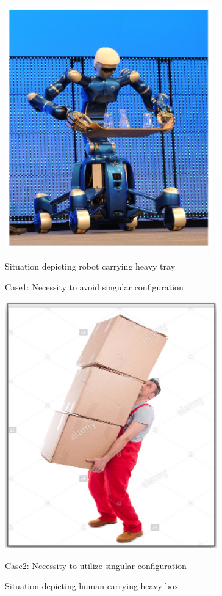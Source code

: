\begin{figure}[h!]
	\centering
	\begin{minipage}{0.45\textwidth}
		\centering
		\includegraphics[width=0.8\textwidth]{images/mot1} %
		\caption{Situation depicting robot carrying heavy tray \cite{robottray}}
		{Case1: Necessity to avoid singular configuration}
	\end{minipage}\hfill
	\begin{minipage}{0.45\textwidth}
		\centering
		\includegraphics[width=0.82\textwidth]{images/mot2} %
		\caption{Situation depicting human carrying heavy box \cite{mot1}}
		{Case2: Necessity to utilize singular configuration}
	\end{minipage}
\end{figure}
